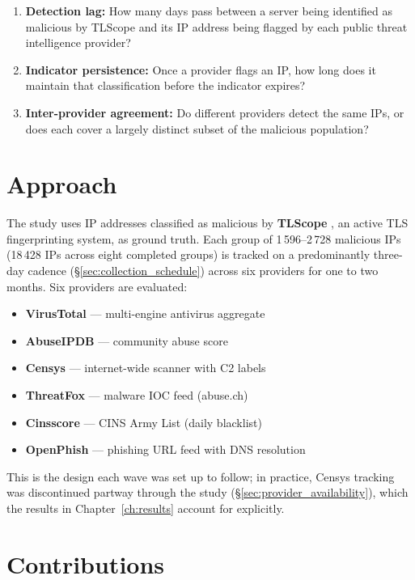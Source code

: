 \documentclass[12pt, a4paper, twoside]{report}
\begin{document}
\begin{enumerate}[label=\textbf{RQ\arabic*.}]
  \item \textbf{Detection lag:} How many days pass between a server being identified as malicious
    by TLScope and its IP address being flagged by each public threat intelligence provider?
  \item \textbf{Indicator persistence:} Once a provider flags an IP, how long does it maintain
    that classification before the indicator expires?
  \item \textbf{Inter-provider agreement:} Do different providers detect the same IPs, or does
    each cover a largely distinct subset of the malicious population?
\end{enumerate}

\section{Approach}

The study uses IP addresses classified as malicious by \textbf{TLScope}
\cite{theofanous2024tlscope}, an active TLS fingerprinting system, as ground truth.
Each group of 1\,596--2\,728 malicious IPs (18\,428 IPs across eight completed groups) is tracked
on a predominantly three-day cadence (\S\ref{sec:collection_schedule}) across six providers for one
to two months. Six providers are evaluated:

\begin{itemize}
  \item \textbf{VirusTotal} --- multi-engine antivirus aggregate
  \item \textbf{AbuseIPDB} --- community abuse score
  \item \textbf{Censys} --- internet-wide scanner with C2 labels
  \item \textbf{ThreatFox} --- malware IOC feed (abuse.ch)
  \item \textbf{Cinsscore} --- CINS Army List (daily blacklist)
  \item \textbf{OpenPhish} --- phishing URL feed with DNS resolution
\end{itemize}

This is the design each wave was set up to follow; in practice, Censys tracking was discontinued
partway through the study (\S\ref{sec:provider_availability}), which the results in
Chapter~\ref{ch:results} account for explicitly.

\section{Contributions}
\end{document}
